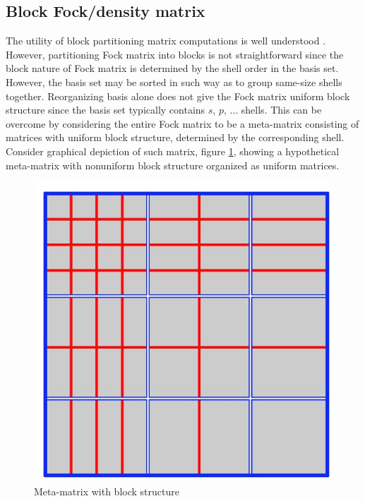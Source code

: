 \documentclass[12pt]{article}
\begin{document}
\subsection*{Block Fock/density matrix}
The utility of block partitioning matrix computations is well
understood \cite{parallel_qr}.
However, partitioning Fock matrix into blocks is not
straightforward since the block nature of Fock matrix is determined by
the shell order in the basis set.  However, the basis set may be sorted
in such way as to group same-size shells together.  Reorganizing basis
alone does not give the Fock matrix uniform block structure since the
basis set typically contains $s$, $p$, ... shells.  This can be
overcome by considering the entire Fock matrix to be a meta-matrix
consisting of matrices with uniform block structure, determined by the
corresponding shell.  Consider graphical depiction of such matrix, figure
\ref{Fock-block}, showing a hypothetical meta-matrix with nonuniform
block structure organized as uniform matrices.

\begin{figure}[here]
\begin{center}
\includegraphics[scale=0.25]{block-matrix.eps}
\caption{Meta-matrix with block structure}
\label{Fock-block}
\end{center}
\end{figure}
\end{document}
